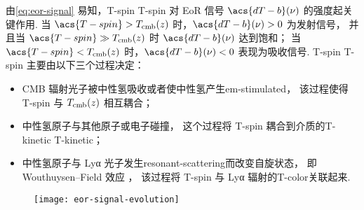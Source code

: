 由\autoref{eq:eor-signal} 易知，\acl{T-spin} \acs{T-spin}
对 EoR 信号 $\acs{dT-b}(\nu)$ 的强度起关键作用.
当 $\acs{T-spin} > T_{\R{cmb}}(z)$ 时，$\acs{dT-b}(\nu) > 0$ 为发射信号，
并且当 $\acs{T-spin} \gg T_{\R{cmb}}(z)$ 时 $\acs{dT-b}(\nu)$ 达到饱和；
当 $\acs{T-spin} < T_{\R{cmb}}(z)$ 时，$\acs{dT-b}(\nu) < 0$ 表现为吸收信号.
\acl{T-spin} \acs{T-spin} 主要由以下三个过程决定：
\begin{itemize}
  \item CMB 辐射光子被中性氢吸收或者使中性氢产生\ac{em-stimulated}，
    该过程使得 \acs{T-spin} 与 $T_{\mathrm{cmb}}(z)$ 相互耦合；
  \item 中性氢原子与其他原子或电子碰撞，
    这个过程将 \acs{T-spin} 耦合到介质的\acl{T-kinetic} \acs{T-kinetic}；
  \item 中性氢原子与 Lyα 光子发生\ac{resonant-scattering}而改变自旋状态，
    即 Wouthuysen--Field 效应 \cite{wouthuysen1952,field1958}，
    该过程将 \acs{T-spin} 与 Lyα 辐射的\ac{T-color}关联起来.
\end{itemize}

\begin{figure}[tbp]
  \centering
  \texttt{[image: eor-signal-evolution]}
  \label{fig:eor-signal-evo}
\end{figure}

